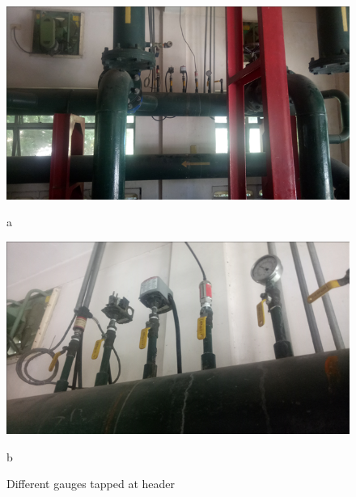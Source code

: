 \begin{figure}[!htb]
	\begin{minipage}[b]{0.3\linewidth}
		\centering
		\includegraphics[width=\textwidth]{figures/fig_ch043_gauges1}
		\caption*{a}
	\end{minipage}	
	\hspace{0.05cm}
	\begin{minipage}[b]{0.3\linewidth}
		\centering
		\includegraphics[width=\textwidth]{figures/fig_ch043_gauges2}
		\caption*{b}
	\end{minipage}
	
	\caption{Different gauges tapped at header}
	\label{gauges_at_header}
\end{figure}

